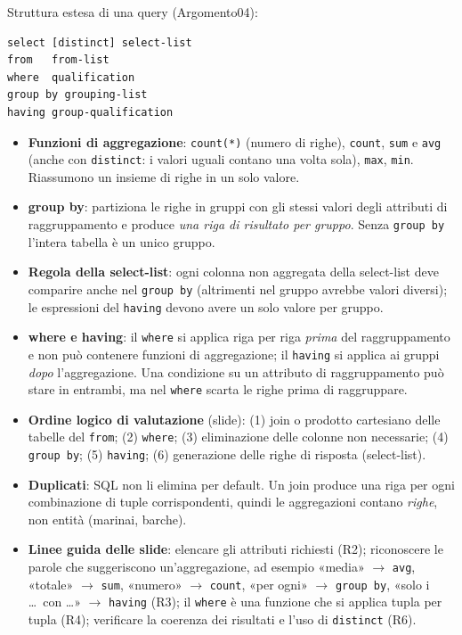 \documentclass[12pt, a4paper]{article}
\begin{document}
Struttura estesa di una query (Argomento04):
\begin{verbatim}
select [distinct] select-list
from   from-list
where  qualification
group by grouping-list
having group-qualification
\end{verbatim}
\begin{itemize}
\item \textbf{Funzioni di aggregazione}: \texttt{count(*)} (numero di righe), \texttt{count}, \texttt{sum} e \texttt{avg} (anche con \texttt{distinct}: i valori uguali contano una volta sola), \texttt{max}, \texttt{min}. Riassumono un insieme di righe in un solo valore.
\item \textbf{group by}: partiziona le righe in gruppi con gli stessi valori degli attributi di raggruppamento e produce \emph{una riga di risultato per gruppo}. Senza \texttt{group by} l'intera tabella è un unico gruppo.
\item \textbf{Regola della select-list}: ogni colonna non aggregata della select-list deve comparire anche nel \texttt{group by} (altrimenti nel gruppo avrebbe valori diversi); le espressioni del \texttt{having} devono avere un solo valore per gruppo.
\item \textbf{where e having}: il \texttt{where} si applica riga per riga \emph{prima} del raggruppamento e non può contenere funzioni di aggregazione; il \texttt{having} si applica ai gruppi \emph{dopo} l'aggregazione. Una condizione su un attributo di raggruppamento può stare in entrambi, ma nel \texttt{where} scarta le righe prima di raggruppare.
\item \textbf{Ordine logico di valutazione} (slide): (1) join o prodotto cartesiano delle tabelle del \texttt{from}; (2) \texttt{where}; (3) eliminazione delle colonne non necessarie; (4) \texttt{group by}; (5) \texttt{having}; (6) generazione delle righe di risposta (select-list).
\item \textbf{Duplicati}: SQL non li elimina per default. Un join produce una riga per ogni combinazione di tuple corrispondenti, quindi le aggregazioni contano \emph{righe}, non entità (marinai, barche).
\item \textbf{Linee guida delle slide}: elencare gli attributi richiesti (R2); riconoscere le parole che suggeriscono un'aggregazione, ad esempio «media» $\to$ \texttt{avg}, «totale» $\to$ \texttt{sum}, «numero» $\to$ \texttt{count}, «per ogni» $\to$ \texttt{group by}, «solo i \dots\ con \dots» $\to$ \texttt{having} (R3); il \texttt{where} è una funzione che si applica tupla per tupla (R4); verificare la coerenza dei risultati e l'uso di \texttt{distinct} (R6).
\end{itemize}
\end{document}
